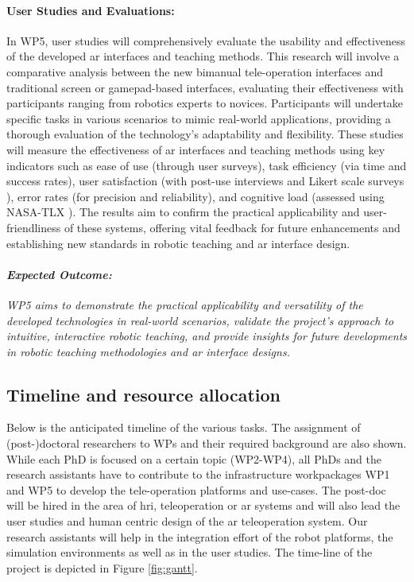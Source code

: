 \documentclass{erc-B2}
\begin{document}
\paragraph{User Studies and Evaluations:}
In WP5, user studies will comprehensively evaluate the usability and effectiveness of the developed \gls*{ar} interfaces and teaching methods. This research will involve a comparative analysis between the new bimanual tele-operation interfaces and traditional screen or gamepad-based interfaces, evaluating their effectiveness with participants ranging from robotics experts to novices. Participants will undertake specific tasks in various scenarios to mimic real-world applications, providing a thorough evaluation of the technology's adaptability and flexibility.
These studies will measure the effectiveness of \gls*{ar} interfaces and teaching methods using key indicators such as ease of use (through user surveys), task efficiency (via time and success rates), user satisfaction (with post-use interviews and Likert scale surveys \cite{allen2007likert}), error rates (for precision and reliability), and cognitive load (assessed using NASA-TLX \cite{hart2006nasa}). The results aim to confirm the practical applicability and user-friendliness of these systems, offering vital feedback for future enhancements and establishing new standards in robotic teaching and \gls*{ar} interface design.

\paragraph{\textit{Expected Outcome:}}\textit{
WP5 aims to demonstrate the practical applicability and versatility of the developed technologies in real-world scenarios, validate the project's approach to intuitive, interactive robotic teaching, and provide insights for future developments in robotic teaching methodologies and \gls*{ar} interface designs.}

\subsection{Timeline and resource allocation}
Below is the anticipated timeline of the various tasks. The assignment of (post-)doctoral researchers to WPs and their required background are also shown.  While each PhD is focused on a certain topic (WP2-WP4), all PhDs and the research assistants have to contribute to the infrastructure workpackages WP1 and WP5 to develop the tele-operation platforms and use-cases. The post-doc will be hired in the area of \gls*{hri}, teleoperation or \gls*{ar} systems and will also lead the user studies and human centric design of the \gls*{ar} teleoperation system. Our research assistants will help in the integration effort of the robot platforms, the simulation environments as well as in the user studies. The time-line of the project is depicted in Figure  \ref{fig:gantt}.
\end{document}
